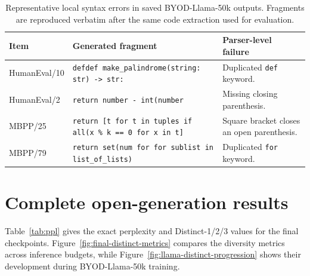 \documentclass{article}
\begin{document}
\begin{table}[t]
\caption{Representative local syntax errors in saved BYOD-Llama-50k outputs. Fragments are reproduced verbatim after the same code extraction used for evaluation.}
\label{tab:syntax-examples}
\centering
\small
\begin{tabular}{p{}p{}p{}}
\toprule
Item & Generated fragment & Parser-level failure \\
\midrule
HumanEval/10 & \texttt{defdef make\_palindrome(string: str) -> str:} & Duplicated \texttt{def} keyword. \\
HumanEval/2 & \texttt{return number - int(number} & Missing closing parenthesis. \\
MBPP/25 & \texttt{return [t for t in tuples if all(x \% k == 0 for x in t]} & Square bracket closes an open parenthesis. \\
MBPP/79 & \texttt{return set(num for for sublist in list\_of\_lists)} & Duplicated \texttt{for} keyword. \\
\bottomrule
\end{tabular}
\end{table}

\clearpage
\section{Complete open-generation results}
\label{app:open-generation-results}

Table~\ref{tab:ppl} gives the exact perplexity and Distinct-1/2/3 values for the final checkpoints. Figure~\ref{fig:final-distinct-metrics} compares the diversity metrics across inference budgets, while Figure~\ref{fig:llama-distinct-progression} shows their development during BYOD-Llama-50k training.
\end{document}
